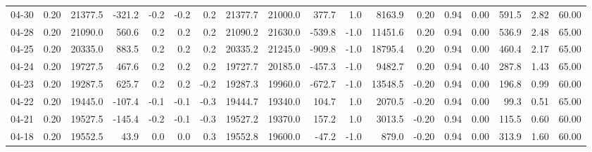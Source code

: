 \begin{threeparttable}
{\begin{tabular}{lrrrrrrrrrrrrrrrrr}
  04-30 &     0.20 & 21377.5 &            -321.2 &              -0.2 &               -0.2 &                0.2 & 21377.7 & 21000.0 &      377.7 &                      1.0 &              8163.9 &       0.20 &      0.94 &           0.00 &            591.5 &            2.82 &                  60.00 \\
  04-28 &     0.20 & 21090.0 &             560.6 &               0.2 &                0.2 &                0.2 & 21090.2 & 21630.0 &     -539.8 &                     -1.0 &             11451.6 &       0.20 &      0.94 &           0.00 &            536.9 &            2.48 &                  65.00 \\
  04-25 &     0.20 & 20335.0 &             883.5 &               0.2 &                0.2 &                0.2 & 20335.2 & 21245.0 &     -909.8 &                     -1.0 &             18795.4 &       0.20 &      0.94 &           0.00 &            460.4 &            2.17 &                  65.00 \\
  04-24 &     0.20 & 19727.5 &             467.6 &               0.2 &                0.2 &                0.2 & 19727.7 & 20185.0 &     -457.3 &                     -1.0 &              9482.7 &       0.20 &      0.94 &           0.40 &            287.8 &            1.43 &                  65.00 \\
  04-23 &     0.20 & 19287.5 &             625.7 &               0.2 &                0.2 &               -0.2 & 19287.3 & 19960.0 &     -672.7 &                     -1.0 &             13548.5 &      -0.20 &      0.94 &           0.00 &            196.8 &            0.99 &                  60.00 \\
  04-22 &     0.20 & 19445.0 &            -107.4 &              -0.1 &               -0.1 &               -0.3 & 19444.7 & 19340.0 &      104.7 &                      1.0 &              2070.5 &      -0.20 &      0.94 &           0.00 &             99.3 &            0.51 &                  65.00 \\
  04-21 &     0.20 & 19527.5 &            -145.4 &              -0.2 &               -0.1 &               -0.3 & 19527.2 & 19370.0 &      157.2 &                      1.0 &              3013.5 &      -0.20 &      0.94 &           0.00 &            115.5 &            0.60 &                  60.00 \\
  04-18 &     0.20 & 19552.5 &              43.9 &               0.0 &                0.0 &                0.3 & 19552.8 & 19600.0 &      -47.2 &                     -1.0 &               879.0 &      -0.20 &      0.94 &           0.00 &            313.9 &            1.60 &                  60.00 \\

\end{tabular}}
\end{threeparttable}
